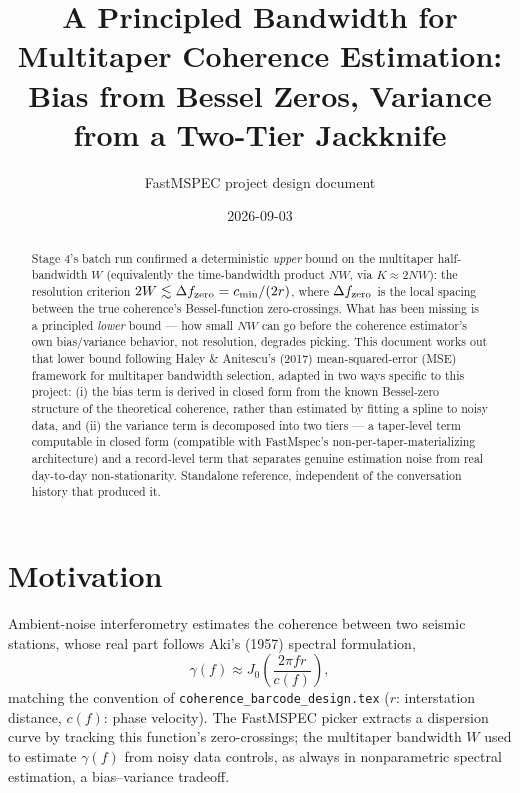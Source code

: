 \documentclass[11pt]{article}
\title{A Principled Bandwidth for Multitaper Coherence Estimation: \\
Bias from Bessel Zeros, Variance from a Two-Tier Jackknife}
\author{FastMSPEC project design document}
\date{2026-09-03}
\begin{document}
\maketitle

\begin{abstract}
Stage 4's batch run confirmed a deterministic \emph{upper} bound on the multitaper
half-bandwidth $W$ (equivalently the time-bandwidth product $NW$, via $K\approx 2NW$): the
resolution criterion $2W \lesssim \Delta f_{\rm zero} = c_{\min}/(2r)$, where $\Delta f_{\rm
zero}$ is the local spacing between the true coherence's Bessel-function zero-crossings.
What has been missing is a principled \emph{lower} bound --- how small $NW$ can go before the
coherence estimator's own bias/variance behavior, not resolution, degrades picking. This
document works out that lower bound following Haley \& Anitescu's (2017) mean-squared-error
(MSE) framework for multitaper bandwidth selection, adapted in two ways specific to this
project: (i) the bias term is derived in closed form from the known Bessel-zero structure of
the theoretical coherence, rather than estimated by fitting a spline to noisy data, and (ii) the
variance term is decomposed into two tiers --- a taper-level term computable in closed form
(compatible with FastMspec's non-per-taper-materializing architecture) and a record-level term
that separates genuine estimation noise from real day-to-day non-stationarity. Standalone
reference, independent of the conversation history that produced it.
\end{abstract}

\tableofcontents

\section{Motivation}

Ambient-noise interferometry estimates the coherence between two seismic stations, whose real
part follows Aki's (1957) spectral formulation,
\begin{equation}
  \gamma(f) \approx J_0\!\left(\frac{2\pi f r}{c(f)}\right),
  \label{eq:aki}
\end{equation}
matching the convention of \texttt{coherence\_barcode\_design.tex} ($r$: interstation distance,
$c(f)$: phase velocity). The FastMSPEC picker extracts a dispersion curve by tracking this
function's zero-crossings; the multitaper bandwidth $W$ used to estimate $\gamma(f)$ from noisy
data controls, as always in nonparametric spectral estimation, a bias--variance tradeoff.
\end{document}
